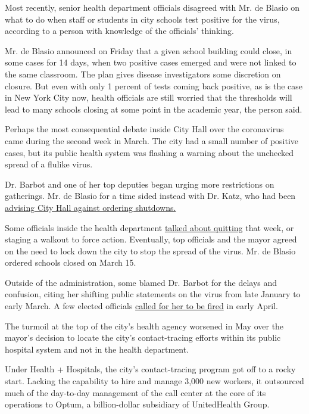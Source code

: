 Most recently, senior health department officials disagreed with Mr. de
Blasio on what to do when staff or students in city schools test
positive for the virus, according to a person with knowledge of the
officials' thinking.

Mr. de Blasio announced on Friday that a given school building could
close, in some cases for 14 days, when two positive cases emerged and
were not linked to the same classroom. The plan gives disease
investigators some discretion on closure. But even with only 1 percent
of tests coming back positive, as is the case in New York City now,
health officials are still worried that the thresholds will lead to many
schools closing at some point in the academic year, the person said.

Perhaps the most consequential debate inside City Hall over the
coronavirus came during the second week in March. The city had a small
number of positive cases, but its public health system was flashing a
warning about the unchecked spread of a flulike virus.

Dr. Barbot and one of her top deputies began urging more restrictions on
gatherings. Mr. de Blasio for a time sided instead with Dr. Katz, who
had been
\href{https://www.nytimes3xbfgragh.onion/2020/05/14/nyregion/coronavirus-de-blasio-mitchell-katz.html}{advising
City Hall against ordering shutdowns.}

Some officials inside the health department
\href{https://www.nytimes3xbfgragh.onion/2020/03/16/nyregion/coronavirus-bill-de-blasio.html}{talked
about quitting} that week, or staging a walkout to force action.
Eventually, top officials and the mayor agreed on the need to lock down
the city to stop the spread of the virus. Mr. de Blasio ordered schools
closed on March 15.

Outside of the administration, some blamed Dr. Barbot for the delays and
confusion, citing her shifting public statements on the virus from late
January to early March. A few elected officials
\href{https://nypost.com/2020/04/04/nyc-pols-urge-de-blasio-to-oust-health-commissioner-over-coronavirus-response/}{called
for her to be fired} in early April.

The turmoil at the top of the city's health agency worsened in May over
the mayor's decision to locate the city's contact-tracing efforts within
its public hospital system and not in the health department.

Under Health + Hospitals, the city's contact-tracing program got off to
a rocky start. Lacking the capability to hire and manage 3,000 new
workers, it outsourced much of the day-to-day management of the call
center at the core of its operations to Optum, a billion-dollar
subsidiary of UnitedHealth Group.

